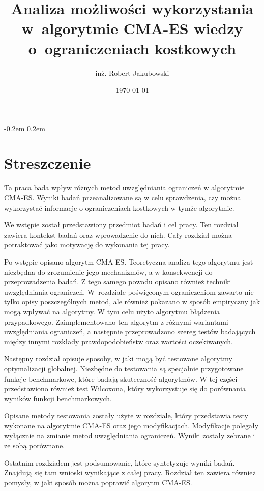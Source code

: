 \documentclass{mini}
\title{Analiza możliwości wykorzystania w~algorytmie CMA-ES wiedzy o~ograniczeniach kostkowych}
\author{inż. Robert Jakubowski}
\date{\today}
\newcommand{\CMAES}{\mbox{CMA-ES}}
\begin{document}
\maketitle

\pagebreak
\thispagestyle{empty}

\openup -0.2em %
\tableofcontents
\openup 0.2em %

\thispagestyle{empty}
\raggedbottom
\pagebreak


\section{Streszczenie}

Ta praca bada wpływ różnych metod uwzględniania ograniczeń w algorytmie \CMAES. Wyniki badań przeanalizowane są w celu sprawdzenia, czy można wykorzystać informacje o ograniczeniach kostkowych w tymże algorytmie.

We wstępie został przedstawiony przedmiot badań i cel pracy. Ten rozdział zawiera kontekst badań oraz wprowadzenie do nich. Cały rozdział można potraktować jako motywację do wykonania tej pracy.

Po wstępie opisano algorytm CMA-ES. Teoretyczna analiza tego algorytmu jest niezbędna do zrozumienie jego mechanizmów, a w konsekwencji do przeprowadzenia badań. Z tego samego powodu opisano również techniki uwzględniania ograniczeń. W~rozdziale poświęconym ograniczeniom zawarto nie tylko opisy poszczególnych metod, ale również pokazano w sposób empiryczny jak mogą wpływać na algorytmy. W tym celu użyto algorytmu błądzenia przypadkowego. Zaimplementowano ten algorytm z różnymi wariantami uwzględniania ograniczeń, a następnie przeprowadzono szereg testów badających między innymi rozkłady prawdopodobieństw oraz wartości oczekiwanych.

Następny rozdział opisuje sposoby, w jaki mogą być testowane algorytmy optymalizacji globalnej. Niezbędne do testowania są specjalnie przygotowane funkcje benchmarkowe, które badają skuteczność algorytmów. W tej części przedstawiono również test Wilcoxona, który wykorzystuje się do porównania wyników funkcji benchmarkowych.

Opisane metody testowania zostały użyte w rozdziale, który przedstawia testy wykonane na algorytmie CMA-ES oraz jego modyfikacjach. Modyfikacje polegały wyłącznie na zmianie metod uwzględniania ograniczeń. Wyniki zostały zebrane i ze sobą porównane.

Ostatnim rozdziałem jest podsumowanie, które syntetyzuje wyniki badań. Znajdują się tam wnioski wynikające z całej pracy. Rozdział ten zawiera również pomysły, w jaki sposób można poprawić algorytm CMA-ES.
\end{document}
